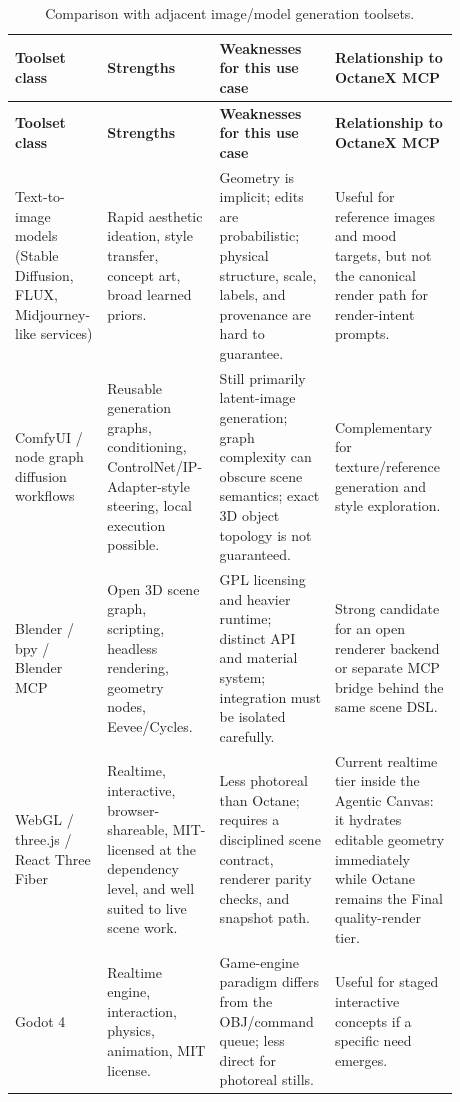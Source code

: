 \documentclass[11pt,a4paper]{article}
\newcommand{\project}{OctaneX MCP}
\begin{document}
\begin{longtable}{p{0.18\linewidth}p{0.20\linewidth}p{0.25\linewidth}p{0.25\linewidth}}
\caption{Comparison with adjacent image/model generation toolsets.}\label{tab:comparison}\\
\toprule
\textbf{Toolset class} & \textbf{Strengths} & \textbf{Weaknesses for this use case} & \textbf{Relationship to \project{}} \\
\midrule
\endfirsthead
\toprule
\textbf{Toolset class} & \textbf{Strengths} & \textbf{Weaknesses for this use case} & \textbf{Relationship to \project{}} \\
\midrule
\endhead
Text-to-image models (Stable Diffusion, FLUX, Midjourney-like services) & Rapid aesthetic ideation, style transfer, concept art, broad learned priors. & Geometry is implicit; edits are probabilistic; physical structure, scale, labels, and provenance are hard to guarantee. & Useful for reference images and mood targets, but not the canonical render path for render-intent prompts. \\
\addlinespace
ComfyUI / node graph diffusion workflows & Reusable generation graphs, conditioning, ControlNet/IP-Adapter-style steering, local execution possible. & Still primarily latent-image generation; graph complexity can obscure scene semantics; exact 3D object topology is not guaranteed. & Complementary for texture/reference generation and style exploration. \\
\addlinespace
Blender / bpy / Blender MCP & Open 3D scene graph, scripting, headless rendering, geometry nodes, Eevee/Cycles. & GPL licensing and heavier runtime; distinct API and material system; integration must be isolated carefully. & Strong candidate for an open renderer backend or separate MCP bridge behind the same scene DSL. \\
\addlinespace
WebGL / three.js / React Three Fiber & Realtime, interactive, browser-shareable, MIT-licensed at the dependency level, and well suited to live scene work. & Less photoreal than Octane; requires a disciplined scene contract, renderer parity checks, and snapshot path. & Current realtime tier inside the Agentic Canvas: it hydrates editable geometry immediately while Octane remains the Final quality-render tier. \\
\addlinespace
Godot 4 & Realtime engine, interaction, physics, animation, MIT license. & Game-engine paradigm differs from the OBJ/command queue; less direct for photoreal stills. & Useful for staged interactive concepts if a specific need emerges. \\

\end{longtable}
\end{document}
